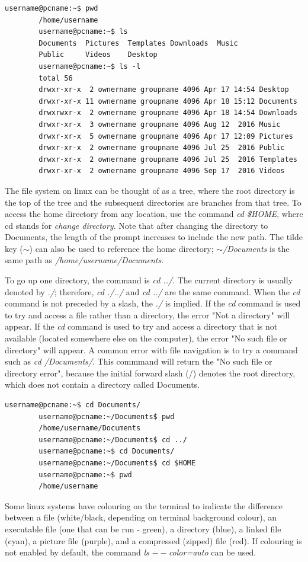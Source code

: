 \documentclass[12pt]{article}
\begin{document}
\begin{lstlisting}[numbers=none]
		username@pcname:~$ pwd
		/home/username		
		username@pcname:~$ ls
		Documents  Pictures  Templates Downloads  Music
		Public     Videos    Desktop
		username@pcname:~$ ls -l
		total 56
		drwxr-xr-x  2 ownername groupname 4096 Apr 17 14:54 Desktop
		drwxr-xr-x 11 ownername groupname 4096 Apr 18 15:12 Documents
		drwxrwxr-x  2 ownername groupname 4096 Apr 18 14:54 Downloads
		drwxr-xr-x  3 ownername groupname 4096 Aug 12  2016 Music
		drwxr-xr-x  5 ownername groupname 4096 Apr 17 12:09 Pictures
		drwxr-xr-x  2 ownername groupname 4096 Jul 25  2016 Public
		drwxr-xr-x  2 ownername groupname 4096 Jul 25  2016 Templates
		drwxr-xr-x  2 ownername groupname 4096 Sep 17  2016 Videos
\end{lstlisting}
\quad\enskip\quad The file system on linux can be thought of as a tree, where the root directory is the top of the tree and the subsequent directories are branches from that tree. To access the home directory from any location, use the command \textit{cd \$HOME}, where cd stands for \textit{change directory}. Note that after changing the directory to Documents, the length of the prompt increases to include the new path. The tilde key ($\sim$) can also be used to reference the home directory; \textit{$\sim$/Documents} is the same path as \textit{/home/username/Documents}.

\quad To go up one directory, the command is \textit{cd ../}. The current directory is usually denoted by \textit{./}; therefore, \textit{cd ./../} and \textit{cd ../} are the same command. When the \textit{cd} command is not preceded by a slash, the \textit{./} is implied. If the \textit{cd} command is used to try and access a file rather than a directory, the error "Not a directory" will appear. If the \textit{cd} command is used to try and access a directory that is not available (located somewhere else on the computer), the error "No such file or directory" will appear. A common error with file navigation is to try a command such as \textit{cd /Documents/}. This commmand will return the "No such file or directory error", because the initial forward slash (/) denotes the root directory, which does not contain a directory called Documents.

\begin{lstlisting}[numbers=none]
		username@pcname:~$ cd Documents/
		username@pcname:~/Documents$ pwd
		/home/username/Documents
		username@pcname:~/Documents$ cd ../
		username@pcname:~$ cd Documents/
		username@pcname:~/Documents$ cd $HOME
		username@pcname:~$ pwd
		/home/username
\end{lstlisting}
\quad\enskip\quad Some linux systems have colouring on the terminal to indicate the difference between a file (white/black, depending on terminal background colour), an executable file (one that can be run - green), a directory (blue), a linked file (cyan), a picture file (purple), and a compressed (zipped) file (red). If colouring is not enabled by default, the command \textit{ls $--$color=auto} can be used.
\end{document}

